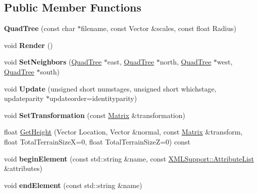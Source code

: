 \subsection*{Public Member Functions}
\begin{DoxyCompactItemize}
\item 
{\bfseries Quad\+Tree} (const char $\ast$filename, const Vector \&scales, const float Radius)\hypertarget{classQuadTree_aecf5c7730ffa33cdef22e58ab5cac6f4}{}\label{classQuadTree_aecf5c7730ffa33cdef22e58ab5cac6f4}

\item 
void {\bfseries Render} ()\hypertarget{classQuadTree_a60c6c4ded3374e548a395d22b7e98b15}{}\label{classQuadTree_a60c6c4ded3374e548a395d22b7e98b15}

\item 
void {\bfseries Set\+Neighbors} (\hyperlink{classQuadTree}{Quad\+Tree} $\ast$east, \hyperlink{classQuadTree}{Quad\+Tree} $\ast$north, \hyperlink{classQuadTree}{Quad\+Tree} $\ast$west, \hyperlink{classQuadTree}{Quad\+Tree} $\ast$south)\hypertarget{classQuadTree_ad291ca87d51043e770d6d19ab0ead038}{}\label{classQuadTree_ad291ca87d51043e770d6d19ab0ead038}

\item 
void {\bfseries Update} (unsigned short numstages, unsigned short whichstage, updateparity $\ast$updateorder=identityparity)\hypertarget{classQuadTree_a4be8581789e7297c4bc0ac6d143708fb}{}\label{classQuadTree_a4be8581789e7297c4bc0ac6d143708fb}

\item 
void {\bfseries Set\+Transformation} (const \hyperlink{classMatrix}{Matrix} \&transformation)\hypertarget{classQuadTree_a143d464cd4a87991f6882d8c5fe48763}{}\label{classQuadTree_a143d464cd4a87991f6882d8c5fe48763}

\item 
float \hyperlink{classQuadTree_ab33708100d1f520c1babd5eef4b1c9e1}{Get\+Height} (Vector Location, Vector \&normal, const \hyperlink{classMatrix}{Matrix} \&transform, float Total\+Terrain\+SizeX=0, float Total\+Terrain\+SizeZ=0) const 
\item 
void {\bfseries begin\+Element} (const std\+::string \&name, const \hyperlink{classXMLSupport_1_1AttributeList}{X\+M\+L\+Support\+::\+Attribute\+List} \&attributes)\hypertarget{classQuadTree_a09a741c09faa70334ddf1f59d8a590fa}{}\label{classQuadTree_a09a741c09faa70334ddf1f59d8a590fa}

\item 
void {\bfseries end\+Element} (const std\+::string \&name)\hypertarget{classQuadTree_ad448901c264535c39643bb65f214a6a0}{}\label{classQuadTree_ad448901c264535c39643bb65f214a6a0}


\end{DoxyCompactItemize}
